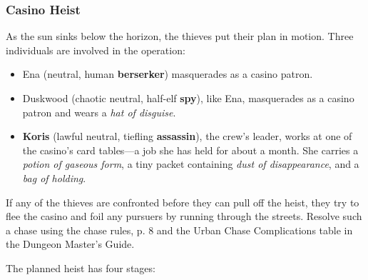 \documentclass[letterpaper, 11pt, bg=full, twocolumn]{dndbook}
\begin{document}
\subsubsection{Casino Heist}

As the sun sinks below the horizon, the thieves put their plan in motion. Three individuals are involved in the operation:

\begin{itemize}
\item Ena (neutral, human \textbf{berserker}) masquerades as a casino patron.
\item Duskwood (chaotic neutral, half-elf \textbf{spy}), like Ena, masquerades as a casino patron and wears a \textit{hat of disguise}.
\item \textbf{Koris} (lawful neutral, tiefling \textbf{assassin}), the crew's leader, works at one of the casino's card tables---a job she has held for about a month. She carries a \textit{potion of gaseous form}, a tiny packet containing \textit{dust of disappearance}, and a \textit{bag of holding}.
\end{itemize}

If any of the thieves are confronted before they can pull off the heist, they try to flee the casino and foil any pursuers by running through the streets. Resolve such a chase using the chase rules, p. 8 and the Urban Chase Complications table in the Dungeon Master's Guide.

The planned heist has four stages:
\end{document}
